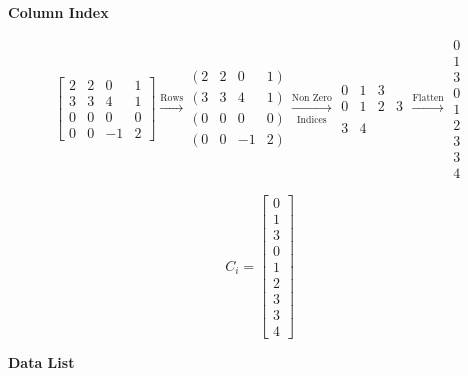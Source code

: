 \documentclass[12pt]{article}
\begin{document}
\noindent
\textbf{Column Index}


\begin{equation*}
\begin{bmatrix}
2 & 2 & 0 & 1\\
3 & 3 & 4 & 1\\
0 & 0 & 0 & 0\\
0 & 0 & -1 & 2
\end{bmatrix}\xrightarrow[\text{}]{\text{Rows}}\begin{matrix}
( \ 2 & 2 & 0 & 1\ )\\
( \ 3 & 3 & 4 & 1\ )\\
( \ 0 & 0 & 0 & 0\ )\\
( \ 0 & 0 & -1 & 2\ )
\end{matrix}\xrightarrow[\text{Indices}]{\text{Non Zero}}\begin{matrix}
0 & 1 & 3 & \\
0 & 1 & 2 & 3\\
 &  &  & \\
3 & 4 &  & 
\end{matrix}\xrightarrow{\text{Flatten}}\begin{matrix}
0\\
1\\
3\\
0\\
1\\
2\\
3\\
3\\
4
\end{matrix}
\end{equation*}

\begin{center}
\begin{equation*}
	C_i=
	\begin{bmatrix}
		0\\
		1\\
		3\\
		0\\
		1\\
		2\\
		3\\
		3\\
		4
	\end{bmatrix}
\end{equation*}
\end{center}
\noindent
\textbf{Data List}
\end{document}
